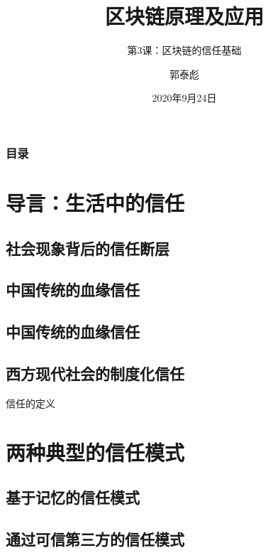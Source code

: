 \documentclass[11pt]{beamer}
\begin{document}
\author{郭泰彪}
\title{区块链原理及应用}
\subtitle{第3课：区块链的信任基础}
\begin{frame}[plain]
\date{2020年9月24日}

	\maketitle
\end{frame}

\begin{frame}
	\frametitle{目录}
	\tableofcontents[sectionstyle=show,subsectionstyle=show/shaded]
\end{frame}

\section{导言：生活中的信任}

\subsection{社会现象背后的信任断层}

\subsection{中国传统的血缘信任}

\subsection{中国传统的血缘信任}

\subsection{西方现代社会的制度化信任}
\begin{frame}{信任的定义}

\end{frame}

\section{两种典型的信任模式}

\subsection{基于记忆的信任模式}

\subsection{通过可信第三方的信任模式}
\end{document}
